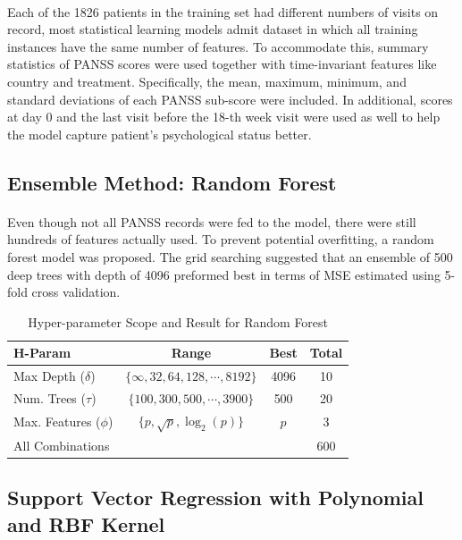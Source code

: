 \documentclass[11pt]{article}
\begin{document}
	\paragraph{} Each of the 1826 patients in the training set had different numbers of visits on record, most statistical learning models admit dataset in which all training instances have the same number of features. To accommodate this, summary statistics of PANSS scores were used together with time-invariant features like country and treatment. Specifically, the mean, maximum, minimum, and standard deviations of each PANSS sub-score were included. In additional, scores at day 0 and the last visit before the 18-th week visit were used as well to help the model capture patient's psychological status better.

	\subsection{Ensemble Method: Random Forest}
	\paragraph{} Even though not all PANSS records were fed to the model, there were still hundreds of features actually used. To prevent potential overfitting, a random forest model was proposed. The grid searching suggested that an ensemble of 500 deep trees with depth of 4096 preformed best in terms of MSE estimated using 5-fold cross validation.
	
	\begin{table}[H]
		\centering
		\begin{tabular}{l|c|c|c}
		H-Param & Range & Best & Total \\
			\hline 
			Max Depth ($\delta$) & $\{\infty, 32, 64, 128, \cdots, 8192\}$ & 4096 & 10 \\
			Num. Trees ($\tau$) & $\{100, 300, 500, \cdots, 3900\}$ & 500 & 20 \\
			Max. Features ($\phi$) & $\{p, \sqrt{p}, \log_2(p)\}$ & $p$ & 3 \\
			\hline
			All Combinations & & & 600
		\end{tabular}
		\caption{Hyper-parameter Scope and Result for Random Forest}
	\end{table}

	\subsection{Support Vector Regression with Polynomial and RBF Kernel}
\end{document}

